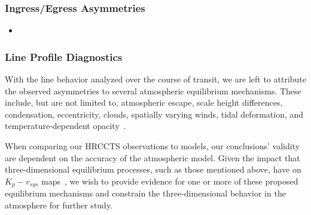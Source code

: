 \documentclass[twocolumn]{aastex631}
\begin{document}
        
            \subsubsection{Ingress/Egress Asymmetries}\label{subsubsec:Ingress/Egress Asymmetries}
                \begin{itemize}
                    \item 
                \end{itemize}
                
            \subsubsection{Line Profile Diagnostics}\label{subsubsec:Wind Profile Diagnostics}
                With the line behavior analyzed over the course of transit, we are left to attribute the observed asymmetries to several atmospheric equilibrium mechanisms. These include, but are not limited to, atmospheric escape, scale height differences, condensation, eccentricity, clouds, spatially varying winds, tidal deformation, and temperature-dependent opacity~\citep{Savel2023}. 

                When comparing our HRCCTS observations to models, our conclusions' validity are dependent on the accuracy of the atmospheric model. Given the impact that three-dimensional equilibrium processes, such as those mentioned above, have on $K_p-v_{sys}$ maps~\citep{Wardenier2021}, we wish to provide evidence for one or more of these proposed equilibrium mechanisms and constrain the three-dimensional behavior in the atmosphere for further study.
\end{document}
